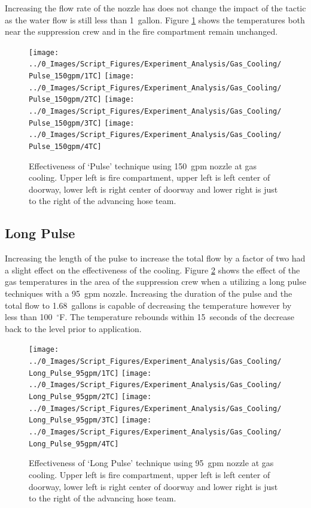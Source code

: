 \documentclass[12pt,oneside]{book}
\begin{document}
Increasing the flow rate of the nozzle has does not change the impact of the tactic as the water flow is still less than 1~gallon. Figure \ref{fig:gas_pulse_150} shows the temperatures both near the suppression crew and in the fire compartment remain unchanged. 

\begin{figure}[H]
\centering
\texttt{[image: ../0\_Images/Script\_Figures/Experiment\_Analysis/Gas\_Cooling/Pulse\_150gpm/1TC]}
\texttt{[image: ../0\_Images/Script\_Figures/Experiment\_Analysis/Gas\_Cooling/Pulse\_150gpm/2TC]}
\texttt{[image: ../0\_Images/Script\_Figures/Experiment\_Analysis/Gas\_Cooling/Pulse\_150gpm/3TC]}
\texttt{[image: ../0\_Images/Script\_Figures/Experiment\_Analysis/Gas\_Cooling/Pulse\_150gpm/4TC]}
\caption[Gas Cooling - Pulse 150~gpm]{Effectiveness of `Pulse' technique using 150~gpm nozzle at gas cooling. Upper left is fire compartment, upper left is left center of doorway, lower left is right center of doorway and lower right is just to the right of the advancing hose team.}
\label{fig:gas_pulse_150}
\end{figure}

\subsection{Long Pulse}
Increasing the length of the pulse to increase the total flow by a factor of two had a slight effect on the effectiveness of the cooling. Figure \ref{fig:gas_long_pulse_95} shows the effect of the gas temperatures in the area of the suppression crew when a utilizing a long pulse techniques with a 95~gpm nozzle. Increasing the duration of the pulse and the total flow to 1.68~gallons is capable of decreasing the temperature however by less than 100~$^\circ$F. The temperature rebounds within 15~seconds of the decrease back to the level prior to application. 

\begin{figure}[H]
\centering
\texttt{[image: ../0\_Images/Script\_Figures/Experiment\_Analysis/Gas\_Cooling/Long\_Pulse\_95gpm/1TC]}
\texttt{[image: ../0\_Images/Script\_Figures/Experiment\_Analysis/Gas\_Cooling/Long\_Pulse\_95gpm/2TC]}
\texttt{[image: ../0\_Images/Script\_Figures/Experiment\_Analysis/Gas\_Cooling/Long\_Pulse\_95gpm/3TC]}
\texttt{[image: ../0\_Images/Script\_Figures/Experiment\_Analysis/Gas\_Cooling/Long\_Pulse\_95gpm/4TC]}
\caption[Gas Cooling - Long Pulse 95~gpm]{Effectiveness of `Long Pulse' technique using 95~gpm nozzle at gas cooling. Upper left is fire compartment, upper left is left center of doorway, lower left is right center of doorway and lower right is just to the right of the advancing hose team.}
\label{fig:gas_long_pulse_95}
\end{figure}
\end{document}
